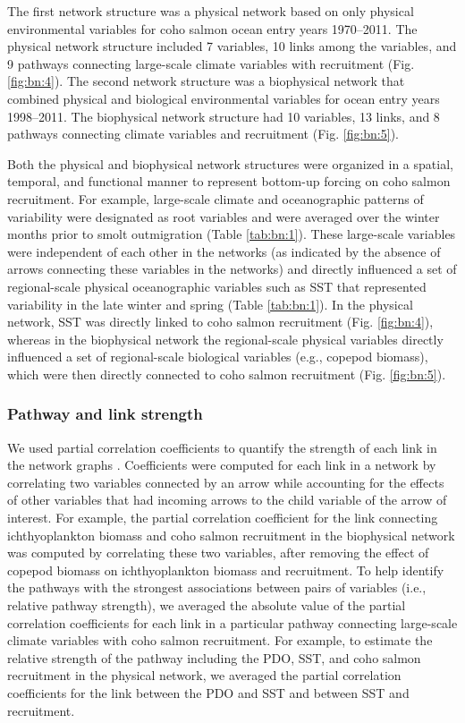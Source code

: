 The first network structure was a physical network based on only physical
environmental variables for coho salmon ocean entry years 1970--2011. The
physical network structure included 7 variables, 10 links among the variables,
and 9 pathways connecting large-scale climate variables with recruitment (Fig.
\ref{fig:bn:4}). The second network structure was a biophysical network that
combined physical and biological environmental variables for ocean entry years
1998--2011. The biophysical network structure had 10 variables, 13 links, and 8
pathways connecting climate variables and recruitment (Fig. \ref{fig:bn:5}).

Both the physical and biophysical network structures were organized in a
spatial, temporal, and functional manner to represent bottom-up forcing on coho
salmon recruitment. For example, large-scale climate and oceanographic patterns
of variability were designated as root variables and were averaged over the
winter months prior to smolt outmigration (Table \ref{tab:bn:1}). These
large-scale variables were independent of each other in the networks (as
indicated by the absence of arrows connecting these variables in the networks)
and directly influenced a set of regional-scale physical oceanographic variables
such as SST that represented variability in the late winter and spring (Table
\ref{tab:bn:1}). In the physical network, SST was directly linked to coho salmon
recruitment (Fig. \ref{fig:bn:4}), whereas in the biophysical network the
regional-scale physical variables directly influenced a set of regional-scale
biological variables (e.g., copepod biomass), which were then directly connected
to coho salmon recruitment (Fig. \ref{fig:bn:5}).


\subsubsection{Pathway and link strength}

We used partial correlation coefficients to quantify the strength of each link
in the network graphs \citep{Zar1999a, Scutari2010, Yang2011}.  Coefficients
were computed for each link in a network by correlating two variables connected
by an arrow while accounting for the effects of other variables that had
incoming arrows to the child variable of the arrow of interest. For example, the
partial correlation coefficient for the link connecting ichthyoplankton biomass
and coho salmon recruitment in the biophysical network was computed by
correlating these two variables, after removing the effect of copepod biomass on
ichthyoplankton biomass and recruitment. To help identify the pathways with the
strongest associations between pairs of variables (i.e., relative pathway
strength), we averaged the absolute value of the partial correlation
coefficients for each link in a particular pathway connecting large-scale
climate variables with coho salmon recruitment.  For example, to estimate the
relative strength of the pathway including the PDO, SST, and coho salmon
recruitment in the physical network, we averaged the partial correlation
coefficients for the link between the PDO and SST and between SST and
recruitment.


